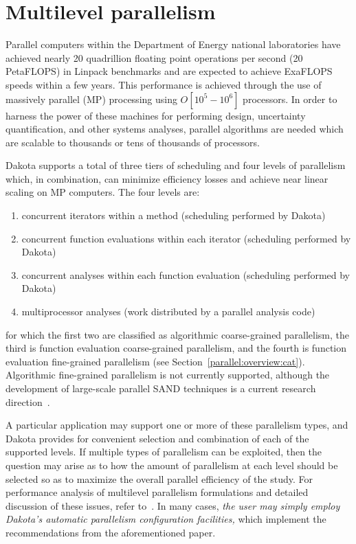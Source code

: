 \section{Multilevel parallelism} \label{parallel:MLP}


Parallel computers within the Department of Energy national
laboratories have achieved nearly 20 quadrillion floating point
operations per second (20 PetaFLOPS) in Linpack benchmarks and are
expected to achieve ExaFLOPS speeds within a few years. This
performance is achieved through the use of massively parallel (MP)
processing using $O[10^{5}-10^{6}]$ processors. In order to harness
the power of these machines for performing design, uncertainty
quantification, and other systems analyses, parallel algorithms are
needed which are scalable to thousands or tens of thousands of processors.

Dakota supports a total of three tiers of scheduling and four levels
of parallelism which, in combination, can minimize efficiency losses
and achieve near linear scaling on MP computers. The four levels are:
\begin{enumerate}
\item concurrent iterators within a method (scheduling performed by
  Dakota)

\item concurrent function evaluations within each iterator (scheduling
  performed by Dakota)

\item concurrent analyses within each function evaluation (scheduling
  performed by Dakota)

\item multiprocessor analyses (work distributed by a parallel
  analysis code)
\end{enumerate}
for which the first two are classified as algorithmic coarse-grained
parallelism, the third is function evaluation coarse-grained
parallelism, and the fourth is function evaluation fine-grained
parallelism (see Section~\ref{parallel:overview:cat}). Algorithmic
fine-grained parallelism is not currently supported, although the
development of large-scale parallel SAND techniques is a current
research direction~\cite{Bar01b}.

A particular application may support one or more of these parallelism
types, and Dakota provides for convenient selection and combination of
each of the supported levels. If multiple types of parallelism can be
exploited, then the question may arise as to how the amount of
parallelism at each level should be selected so as to maximize the
overall parallel efficiency of the study. For performance analysis of
multilevel parallelism formulations and detailed discussion of these
issues, refer to~\cite{Eld00}.  In many cases, \emph{the user may
simply employ Dakota's automatic parallelism configuration facilities,}
which implement the recommendations from the aforementioned paper.

